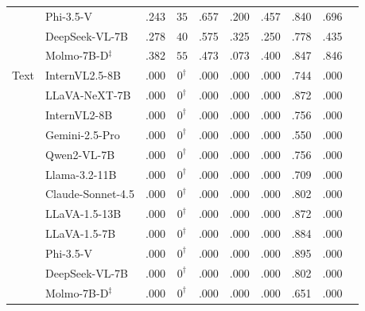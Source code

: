 \begin{tabular}{@{}llcccccccc@{}}
 & Phi-3.5-V & .243 & $35$ & .657 & .200 & .457 & .840 & .696 \\
 & DeepSeek-VL-7B & .278 & $40$ & .575 & .325 & .250 & .778 & .435 \\
 & Molmo-7B-D$^\ddagger$ & .382 & $55$ & .473 & .073 & .400 & .847 & .846 \\
\midrule
Text & InternVL2.5-8B & .000 & $0^\dagger$ & .000 & .000 & .000 & .744 & .000 \\
 & LLaVA-NeXT-7B & .000 & $0^\dagger$ & .000 & .000 & .000 & .872 & .000 \\
 & InternVL2-8B & .000 & $0^\dagger$ & .000 & .000 & .000 & .756 & .000 \\
 & Gemini-2.5-Pro & .000 & $0^\dagger$ & .000 & .000 & .000 & .550 & .000 \\
 & Qwen2-VL-7B & .000 & $0^\dagger$ & .000 & .000 & .000 & .756 & .000 \\
 & Llama-3.2-11B & .000 & $0^\dagger$ & .000 & .000 & .000 & .709 & .000 \\
 & Claude-Sonnet-4.5 & .000 & $0^\dagger$ & .000 & .000 & .000 & .802 & .000 \\
 & LLaVA-1.5-13B & .000 & $0^\dagger$ & .000 & .000 & .000 & .872 & .000 \\
 & LLaVA-1.5-7B & .000 & $0^\dagger$ & .000 & .000 & .000 & .884 & .000 \\
 & Phi-3.5-V & .000 & $0^\dagger$ & .000 & .000 & .000 & .895 & .000 \\
 & DeepSeek-VL-7B & .000 & $0^\dagger$ & .000 & .000 & .000 & .802 & .000 \\
 & Molmo-7B-D$^\ddagger$ & .000 & $0^\dagger$ & .000 & .000 & .000 & .651 & .000 \\
\bottomrule
\end{tabular}